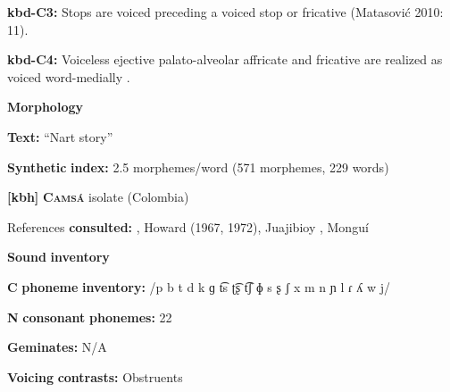 \documentclass[output=paper]{langsci/langscibook}
\begin{document}
\begin{styleBody}
\textbf{kbd-C3:} Stops are voiced preceding a voiced stop or fricative (Matasović 2010: 11).
\end{styleBody}

\begin{styleBody}
\textbf{kbd-C4:} Voiceless ejective palato-alveolar affricate and fricative are realized as voiced word-medially \citep[19]{Kuipers1960}.
\end{styleBody}

\begin{styleBody}
\textbf{Morphology}
\end{styleBody}

\begin{styleBody}
\textbf{Text:} “Nart story” \citep[223-231]{Applebaum2013}
\end{styleBody}

\begin{styleBody}
\textbf{Synthetic} \textbf{index:} 2.5 morphemes/word (571 morphemes, 229 words)
\end{styleBody}

\begin{styleBody}
\textbf{[kbh]}   \textbf{\textsc{Camsá}}  isolate (Colombia)
\end{styleBody}

\begin{styleBody}
References \textbf{consulted:} \citet{Fabre2002}, Howard (1967, 1972), Juajibioy \citet{Chindoy1962}, Monguí \citet{Sánchez1981}
\end{styleBody}

\begin{styleBody}
\textbf{Sound} \textbf{inventory}
\end{styleBody}

\begin{styleBody}
\textbf{C} \textbf{phoneme} \textbf{inventory:} /p b t d k ɡ t͡s ʈ͡ʂ t͡ʃ ɸ s ʂ ʃ x m n ɲ l ɾ ʎ w j/
\end{styleBody}

\begin{styleBody}
\textbf{N} \textbf{consonant} \textbf{phonemes:} 22
\end{styleBody}

\begin{styleBody}
\textbf{Geminates:} N/A
\end{styleBody}

\begin{styleBody}
\textbf{Voicing} \textbf{contrasts:} Obstruents
\end{styleBody}
\end{document}
